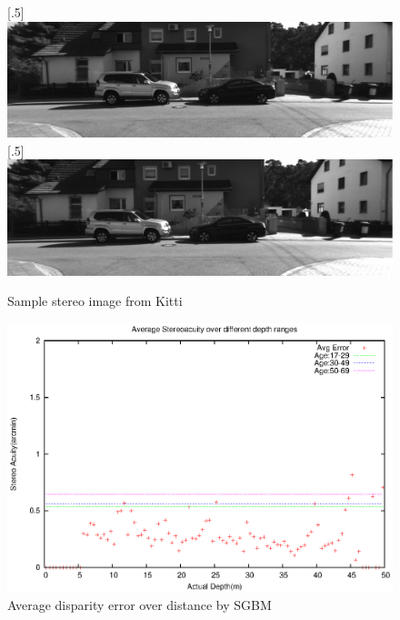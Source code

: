 \begin{figure}[h!]
\centering
{}
[.5\linewidth]{\includegraphics[scale=0.21]{000005L}}%
[.5\linewidth]{\includegraphics[scale=0.21]{000005R}}%
\caption{Sample stereo image from Kitti}
\label{fig:img5}
\end{figure}

\begin{figure}[H]
\centering
\includegraphics[scale=0.8]{sgbmimg5pix3msk}
\caption{Average disparity error over distance by SGBM}
\label{fig:imgmsk}
\end{figure} 

